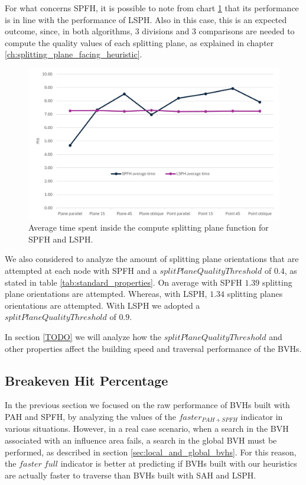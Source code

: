 \documentclass{PoliMi_MasterThesis}
\begin{document}
For what concerns SPFH, it is possible to note from chart \ref{fig:spfh_build_time_chart} that its performance is in line with the performance of LSPH. Also in this case, this is an expected outcome, since, in both algorithms, 3 divisions and 3 comparisons are needed to compute the quality values of each splitting plane, as explained in chapter \ref{ch:splitting_plane_facing_heuristic}.

\begin{figure}[H] 
	\centering
	\includegraphics[width=\textwidth]{Images/spfh_build_time_chart.png}
	\caption{Average time spent inside the compute splitting plane function for SPFH and LSPH.}
	\label{fig:spfh_build_time_chart}
\end{figure}

We also considered to analyze the amount of splitting plane orientations that are attempted at each node with SPFH and a $splitPlaneQualityThreshold$ of $0.4$, as stated in table \ref{tab:standard_properties}. On average with SPFH $1.39$ splitting plane orientations are attempted. Whereas, with LSPH, $1.34$ splitting planes orientations are attempted. With LSPH we adopted a $splitPlaneQualityThreshold$ of $0.9$.

In section \ref{TODO} we will analyze how the $splitPlaneQualityThreshold$ and other properties affect the building speed and traversal performance of the BVHs.

\subsection{Breakeven Hit Percentage} \label{ssec:breakeven_hit_percentage}
In the previous section we focused on the raw performance of BVHs built with PAH and SPFH, by analyzing the values of the $faster_{PAH+SPFH}$ indicator in various situations. However, in a real case scenario, when a search in the BVH associated with an influence area fails, a search in the global BVH must be performed, as described in section \ref{sec:local_and_global_bvhs}. For this reason, the $faster \; full$ indicator is better at predicting if BVHs built with our heuristics are actually faster to traverse than BVHs built with SAH and LSPH.
\end{document}

